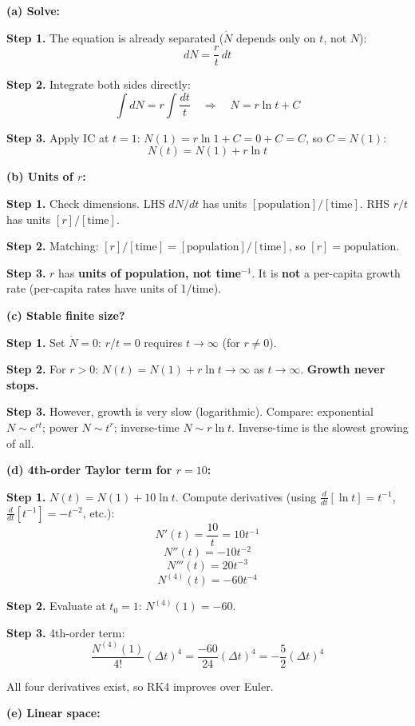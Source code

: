 \documentclass[10pt]{article}
\newcommand{\thus}{\quad\Longrightarrow\quad}
\begin{document}
\begin{solution}
\textbf{(a) Solve:}

\textbf{Step 1.} The equation is already separated ($\dot N$ depends only on $t$, not $N$):
\[
dN = \frac{r}{t}\,dt
\]

\textbf{Step 2.} Integrate both sides directly:
\[
\int dN = r\int\frac{dt}{t} \thus N = r\ln t + C
\]

\textbf{Step 3.} Apply IC at $t = 1$: $N(1) = r\ln 1 + C = 0 + C = C$, so $C = N(1)$:
\[
\boxed{N(t) = N(1) + r\ln t}
\]

\medskip\textbf{(b) Units of $r$:}

\textbf{Step 1.} Check dimensions. LHS $dN/dt$ has units $[\text{population}]/[\text{time}]$. RHS $r/t$ has units $[r]/[\text{time}]$.

\textbf{Step 2.} Matching: $[r]/[\text{time}] = [\text{population}]/[\text{time}]$, so $[r] = \text{population}$.

\textbf{Step 3.} $r$ has \textbf{units of population, not time$^{-1}$}. It is \textbf{not} a per-capita growth rate (per-capita rates have units of 1/time).

\medskip\textbf{(c) Stable finite size?}

\textbf{Step 1.} Set $\dot N = 0$: $r/t = 0$ requires $t \to \infty$ (for $r \neq 0$).

\textbf{Step 2.} For $r > 0$: $N(t) = N(1) + r\ln t \to \infty$ as $t \to \infty$. \textbf{Growth never stops.}

\textbf{Step 3.} However, growth is very slow (logarithmic). Compare: exponential $N \sim e^{rt}$; power $N \sim t^r$; inverse-time $N \sim r\ln t$. Inverse-time is the slowest growing of all.

\medskip\textbf{(d) 4th-order Taylor term for $r = 10$:}

\textbf{Step 1.} $N(t) = N(1) + 10\ln t$. Compute derivatives (using $\frac{d}{dt}[\ln t] = t^{-1}$, $\frac{d}{dt}[t^{-1}] = -t^{-2}$, etc.):
\[
N'(t) = \frac{10}{t} = 10t^{-1}
\]
\[
N''(t) = -10t^{-2}
\]
\[
N'''(t) = 20t^{-3}
\]
\[
N^{(4)}(t) = -60t^{-4}
\]

\textbf{Step 2.} Evaluate at $t_0 = 1$: $N^{(4)}(1) = -60$.

\textbf{Step 3.} 4th-order term:
\[
\frac{N^{(4)}(1)}{4!}(\Delta t)^4 = \frac{-60}{24}(\Delta t)^4 = -\frac{5}{2}(\Delta t)^4
\]

All four derivatives exist, so RK4 improves over Euler.

\medskip\textbf{(e) Linear space:}


\end{solution}
\end{document}
